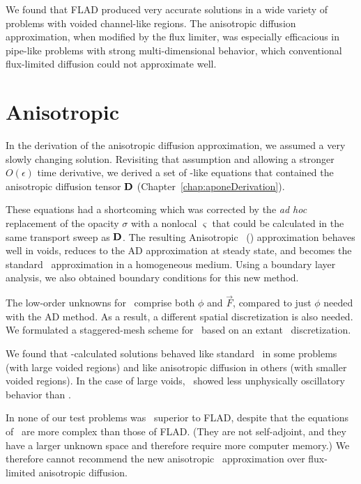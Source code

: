 We found that FLAD produced very accurate solutions in a wide
variety of problems with voided channel-like regions. The anisotropic diffusion
approximation, when modified by the flux limiter, was especially efficacious in
pipe-like problems with strong multi-dimensional behavior, which conventional
flux-limited diffusion could not approximate well.

\vspace{-9pt}
\section{Anisotropic \texorpdfstring{\Pone}{P1}}

In the derivation of the anisotropic diffusion approximation, we assumed a very
slowly changing solution. Revisiting that assumption and allowing a stronger
$O(\epsilon)$ time derivative, we
derived a set of \Pone-like equations that contained the anisotropic diffusion
tensor $\mathbf{D}$ (Chapter~\ref{chap:aponeDerivation}). 

These equations
had a shortcoming which was corrected by the \emph{ad hoc} replacement of the
opacity $\sigma$ with a nonlocal $\varsigma$ that could be
calculated in the same transport sweep as $\mathbf{D}$. The resulting Anisotropic
\Pone\ (\APone) approximation behaves well in voids, reduces to the AD
approximation at steady state, and becomes the standard \Pone\ approximation in
a homogeneous medium.
Using a boundary layer analysis, we also obtained boundary conditions for this
new method.

The low-order unknowns for \APone\ comprise both $\phi$ and $\vec{F}$, compared
to just $\phi$ needed with the AD method.  As a result, a different spatial
discretization is also needed. We formulated a staggered-mesh
scheme for \APone\ based on an extant \Pone\ discretization.

We found that \APone-calculated solutions behaved like standard \Pone\ in some
problems (with large voided regions) and like anisotropic diffusion in others
(with smaller voided regions). In the case of large voids, \APone\ showed less
unphysically oscillatory behavior than \Pone.

In none of our test problems was \APone\ superior to FLAD,
despite that the equations of \APone\ are more complex than those of FLAD. (They
are not
self-adjoint, and they have a larger unknown space and therefore require more
computer memory.)
We therefore cannot recommend the new anisotropic \Pone\ approximation over
flux-limited anisotropic diffusion.

